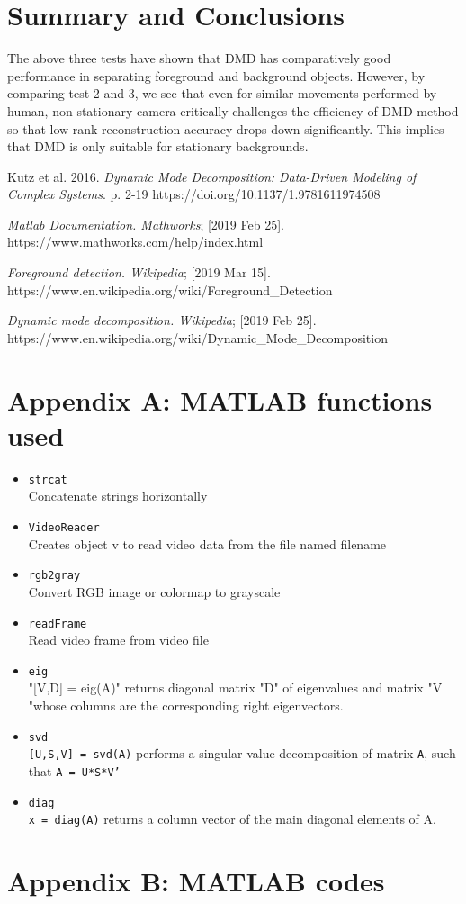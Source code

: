 \documentclass[11pt,a4paper]{article}
\numberwithin{equation}{subsection}
\begin{document}
\section{Summary and Conclusions}
The above three tests have shown that DMD has comparatively good performance in separating foreground and background objects. However, by comparing test 2 and 3, we see that even for similar movements performed by human, non-stationary camera critically challenges the efficiency of DMD method so that low-rank reconstruction accuracy drops down significantly. This implies that DMD is only suitable for stationary backgrounds.


\begin{thebibliography}{11}
	Kutz et al. 2016.
	\textit{Dynamic Mode Decomposition: Data-Driven Modeling of Complex Systems}. p. 2-19 https://doi.org/10.1137/1.9781611974508
	
	\textit{Matlab Documentation. Mathworks}; [2019 Feb 25]. \\https://www.mathworks.com/help/index.html

	\textit{Foreground detection. Wikipedia}; [2019 Mar 15]. \\https://www.en.wikipedia.org/wiki/Foreground\_Detection

	\textit{Dynamic mode decomposition. Wikipedia}; [2019 Feb 25]. \\https://www.en.wikipedia.org/wiki/Dynamic\_Mode\_Decomposition
\end{thebibliography}


\section*{Appendix A: MATLAB functions used}
	\begin{itemize}
		\item \texttt{strcat}\\
		Concatenate strings horizontally
		\item \texttt{VideoReader}\\
		Creates object v to read video data from the file named filename
		\item \texttt{rgb2gray}\\
		Convert RGB image or colormap to grayscale
		\item \texttt{readFrame}\\
		Read video frame from video file
		\item \texttt{eig}\\
		"[V,D] = eig(A)" returns diagonal matrix "D" of eigenvalues and matrix "V "whose columns are the corresponding right eigenvectors.
		\item \texttt{svd}\\
		\texttt{[U,S,V] = svd(A)} performs a singular value decomposition of matrix \texttt{A}, such that \texttt{A = U*S*V'}
		
		\item \texttt{diag}\\
		\texttt{x = diag(A)} returns a column vector of the main diagonal elements of A.

	\end{itemize}


\section*{Appendix B: MATLAB codes}

\end{document}
